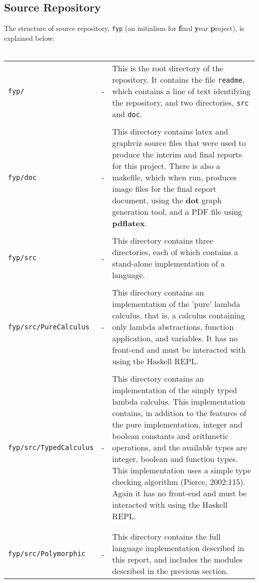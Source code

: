 \documentclass{article}
\begin{document}
\subsection{Source Repository}
The structure of source repository, \texttt{fyp} (an initialism for \textbf{f}inal \textbf{y}ear \textbf{p}roject), is explained below:
\\\\
\begin{tabular}{ p{37mm} p{2mm} p{70mm} }
    \texttt{fyp/}                  & - & This is the root directory of the repository. It contains the file \texttt{readme}, which contains a line of text identifying the repository, and two directories, \texttt{src} and \texttt{doc}. \\
                                   &   & \\
    \texttt{fyp/doc}               & - & This directory contains latex and graphviz source files that were used to produce the interim and final reports for this project. There is also a makefile, which when run, produces image files for the final report document, using the \textbf{dot} graph generation tool, and a PDF file using \textbf{pdflatex}. \\
                                   &   & \\
    \texttt{fyp/src}               & - & This directory contains three directories, each of which contains a stand-alone implementation of a language.\\
                                   &   & \\
    \texttt{fyp/src/PureCalculus}  & - & This directory contains an implementation of the 'pure' lambda calculus, that is, a calculus containing only lambda abstractions, function application, and variables. It has no front-end and must be interacted with using the Haskell REPL. \\
                                   &   & \\
    \texttt{fyp/src/TypedCalculus} & - & This directory contains an implementation of the simply typed lambda calculus. This implementation contains, in addition to the features of the pure implementation, integer and boolean constants and arithmetic operations, and the available types are integer, boolean and function types. This implementation uses a simple type checking algorithm (Pierce, 2002:115). Again it has no front-end and must be interacted with using the Haskell REPL. \\\\
                                   &   & \\
    \texttt{fyp/src/Polymorphic}   & - & This directory contains the full language implementation described in this report, and includes the modules described in the previous section. \\
\end{tabular}
\end{document}
